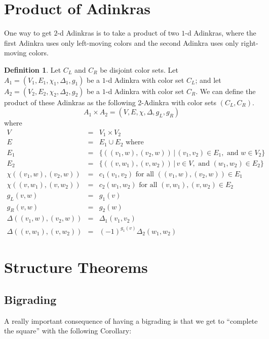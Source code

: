 \documentclass[12pt,twoside,singlespace]{article}
\numberwithin{equation}{section}
\theoremstyle{definition}
\newtheorem{definition}[equation]{Definition}
\begin{document}
\section{Product of Adinkras}
One way to get $2$-d Adinkras is to take a product of two $1$-d Adinkras, where the first Adinkra uses only left-moving colors and the second Adinkra uses only right-moving colors.

\begin{definition}
Let $C_L$ and $C_R$ be disjoint color sets.  Let $A_1=(V_1, E_1, \chi_1, \Delta_1,g_1)$ be a $1$-d Adinkra with color set $C_L$; and let $A_2=(V_2, E_2, \chi_2, \Delta_2,g_2)$ be a $1$-d Adinkra with color set $C_R$.  We can define the product of these Adinkras as the following 2-Adinkra with color sets $(C_L,C_R)$.
\[A_1\times A_2=(V,E,\chi,\Delta,g_L,g_R)\]
where
\begin{eqnarray*}
V&=&V_1\times V_2\\
E&=&E_1\cup E_2\mbox{ where}\\
E_1&=&\{((v_1,w),(v_2,w))\,|\,(v_1, v_2)\in E_1,\mbox{ and } w\in V_2\}\\
E_2&=&\{((v,w_1),(v,w_2))\,|\,v\in V, \mbox{ and }(w_1,w_2)\in E_2\}\\
\chi((v_1,w),(v_2,w))&=&c_1(v_1,v_2)\mbox{ for all $((v_1,w),(v_2,w))\in E_1$}\\
\chi((v,w_1),(v,w_2))&=&c_2(w_1,w_2)\mbox{ for all $(v,w_1),(v,w_2)\in E_2$}\\
g_L(v,w)&=&g_1(v)\\
g_R(v,w)&=&g_2(w)\\
\Delta((v_1,w),(v_2,w))&=&\Delta_1(v_1,v_2)\\
\Delta((v,w_1),(v,w_2))&=&(-1)^{g_1(v)}\Delta_2(w_1,w_2)
\end{eqnarray*}
\end{definition}



\section{Structure Theorems}

\subsection{Bigrading}


A really important consequence of having a bigrading is that we get to ``complete the square'' with the following Corollary:
\end{document}

